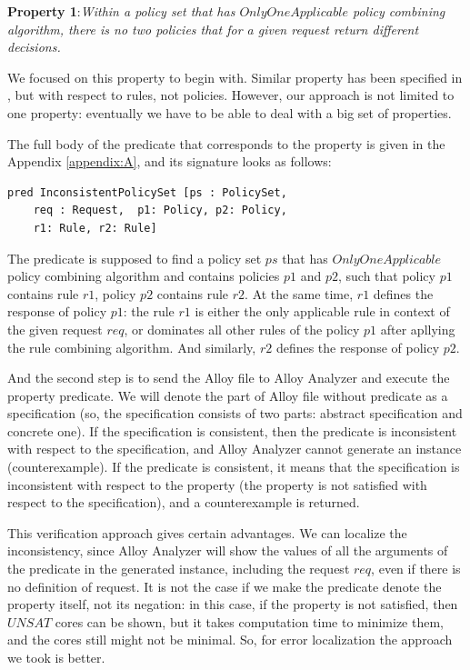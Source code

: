 \documentclass{acm_proc_article-sp}
\begin{document}
\textbf{Property 1}:\textit{Within a policy set that has $OnlyOneApplicable$ policy combining algorithm, there is no two policies that for a given request return different decisions.}

We focused on this property to begin with. Similar property has been specified in \cite{acp:alloy}, but with respect to rules, not policies. However, our approach is not limited to one property: eventually we have to be able to deal with a big set of properties. 

The full body of the predicate that corresponds to the property is given in the Appendix \ref{appendix:A}, and its signature looks as follows:	

\begin{verbatim}
pred InconsistentPolicySet [ps : PolicySet, 
    req : Request,  p1: Policy, p2: Policy, 
    r1: Rule, r2: Rule]
\end{verbatim}

The predicate is supposed to find a policy set $ps$ that has $OnlyOneApplicable$ policy combining algorithm and contains policies $p1$ and $p2$, such that policy $p1$ contains rule $r1$, policy $p2$ contains rule $r2$. At the same time, $r1$ defines the response of policy $p1$: the rule $ r1$ is either the only applicable rule in context of the given request $req$, or dominates all other rules of the policy $p1$ after apllying the rule combining algorithm. And similarly, $r2$ defines the response of policy $p2$.

And the second step is to send the Alloy file to Alloy Analyzer and execute the property predicate. We will denote the part of Alloy file without predicate as a specification (so, the specification consists of two parts: abstract specification and concrete one). If the specification is consistent, then the predicate is inconsistent with respect to the specification, and Alloy Analyzer cannot generate an instance (counterexample). If the predicate is consistent, it means that the specification is inconsistent with respect to the property (the property is not satisfied with respect to the specification), and a counterexample is returned.

This verification approach gives certain advantages. We can localize the inconsistency, since Alloy Analyzer will show the values of all the arguments of the predicate in the generated instance, including the request $req$, even if there is no definition of request. It is not the case if we make the predicate denote the property itself, not its negation: in this case, if the property is not satisfied, then $UNSAT$ cores can be shown, but it takes computation time to minimize them, and the cores still might not be minimal. So, for error localization the approach we took is better.
\end{document}
